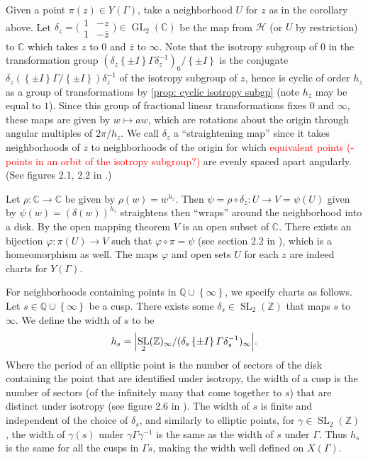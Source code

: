 \documentclass[10pt,leqno,twoside]{article}
\theoremstyle{plain}
\theoremstyle{definition}
\numberwithin{equation}{section}
\numberwithin{lem}{section}
\newcommand{\cbr}[1]{\left\{#1\right\}}
\DeclareMathOperator{\GL}{GL}
\DeclareMathOperator{\SL}{SL}
\newcommand{\slz}{\SL_2(\mathbb{Z})}
\newcommand{\sai}[1]{\textcolor{red}{#1}}
\begin{document}
Given a point $\pi(z)\in Y(\varGamma)$, take a neighborhood $U$ for $z$ as in the corollary above. Let $\delta_z  = \big(\!\begin{smallmatrix}
    1 & -z \\ 1 & -\overline{z}
\end{smallmatrix}\!\big)\in \GL_2(\mathbb C)$ be the map from $\mathcal H$ (or $U$ by restriction) to $\mathbb C$ which takes $z$ to $0$ and $\overline{z}$ to $\infty$. Note that the isotropy subgroup of $0$ in the transformation group $(\delta_z\cbr{\pm I}\varGamma\delta_z^{-1})_0/\cbr{\pm I}$ is the conjugate $\delta_z(\cbr{\pm I}\varGamma/\cbr{\pm I})\delta_z^{-1}$ of the isotropy subgroup of $z$, hence is cyclic of order $h_z$ as a group of transformations by \cref{prop: cyclic isotropy subgp} (note $h_z$ may be equal to $1$). Since this group of fractional linear transformations fixes $0$ and $\infty$, these maps are given by $w\mapsto aw$, which are rotations about the origin through angular multiples of $2\pi/h_z$. We call $\delta_z$ a ``straightening map'' since it takes neighborhoods of $z$ to neighborhoods of the origin for which \sai{equivalent points (- points in an orbit of the isotropy subgroup?)} are evenly spaced apart angularly. (See figures 2.1, 2.2 in \cite{diamond}.)

Let $\rho\colon \mathbb C\to \mathbb C$ be given by $\rho(w) = w^{h_z}$. Then $\psi = \rho\circ \delta_z \colon U\to V = \psi(U)$ given by $\psi(w) = (\delta(w))^{h_z}$ straightens then ``wraps'' around the neighborhood into a disk. By the open mapping theorem $V$ is an open subset of $\mathbb C$. There exists an bijection $\varphi\colon \pi(U)\to V$ such that $\varphi\circ\pi = \psi$ (see section 2.2 in \cite{diamond}), which is a homeomorphism as well. The maps $\varphi$ and open sets $U$ for each $z$ are indeed charts for $Y(\varGamma)$.

For neighborhoods containing points in $\mathbb Q\cup\cbr{\infty}$, we specify charts as follows. Let $s\in\mathbb Q\cup\cbr{\infty}$ be a cusp. There exists some $\delta_s\in\slz$ that maps $s$ to $\infty$. We define the width of $s$ to be 
\[h_s = \abs{\slz_\infty/(\delta_s\cbr{\pm I}\varGamma\delta_s^{-1})_\infty}.\] Where the period of an elliptic point is the number of sectors of the disk containing the point that are identified under isotropy, the width of a cusp is the number of sectors (of the infinitely many that come together to $s$) that are distinct under isotropy (see figure 2.6 in \cite{diamond}). The width of $s$ is finite and independent of the choice of $\delta_s$, and similarly to elliptic points, for $\gamma\in\slz$, the width of $\gamma(s)$ under $\gamma\varGamma\gamma^{-1}$ is the same as the width of $s$ under $\varGamma$. Thus $h_s$ is the same for all the cusps in $\varGamma s$, making the width well defined on $X(\varGamma)$.
\end{document}
